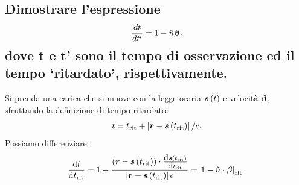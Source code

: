 \subsection[]{Dimostrare l’espressione
\[
	\frac{dt}{dt'}=1-\hat{n}\boldsymbol{\beta}
.\] 
dove t e t’ sono il tempo di osservazione ed il tempo ‘ritardato’, rispettivamente.}
\label{sec:3.b.1}
Si prenda una carica che si muove con la legge oraria $\boldsymbol{s}\left( t \right) $ e velocità $\boldsymbol{\beta}$, sfruttando la definizione di tempo ritardato: \[
	t=t_{\text{rit}} + \left| \boldsymbol{r}- \boldsymbol{s}\left( t_{\text{rit}} \right)  \right|/c 
.\]
Possiamo differenziare: \[
	\frac{\mbox{d} t}{\mbox{d} t_{\text{rit}}} = 1- \frac{\left( \boldsymbol{r}-\boldsymbol{s}\left( t_{\text{rit}} \right) \right)\cdot \frac{\mbox{d} \boldsymbol{s}\left( t_{\text{rit}} \right) }{\mbox{d} t_{\text{rit}}} }{\left| \boldsymbol{r}-\boldsymbol{s}\left( t_{\text{rit}} \right)  \right|c }=\left.1-\hat{n}\cdot \boldsymbol{\beta}\right|_{\text{rit}}
.\] 
